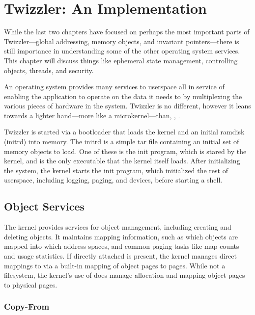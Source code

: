 
\chapter{Twizzler: An Implementation}\label{ch:twizzler}

\begin{chabstract}
    While the last two chapters have focused on perhaps the most important parts of Twizzler---global addressing, memory
    objects, and invariant pointers---there is still importance in understanding some of the other operating system
    services. This chapter will discuss things like ephemeral state management, controlling objects, threads, and security.
\end{chabstract}

An operating system provides many services to userspace all in service of enabling the application to operate on the
data it needs to by multiplexing the various pieces of hardware in the system. Twizzler is no different, however it
leans towards a lighter hand---more like a microkernel---than, \eg, \unix.

Twizzler is started via a bootloader that loads the kernel and an initial ramdisk (initrd) into memory. The initrd is a
simple tar file containing an initial set of memory objects to load. One of these is the init program, which is stared
by the kernel, and is the only executable that the kernel itself loads. After initializing the system, the kernel starts
the init program, which initialized the rest of userspace, including logging, paging, and devices, before starting a shell.

\section{Object Services}

The kernel provides services for object management, including creating and deleting objects. It maintains mapping
information, such as which objects are mapped into which address spaces, and common paging tasks like map counts and
usage statistics. If directly attached \NVM is present, the kernel manages direct mappings to \NVM via a built-in
mapping of object pages to \NVM pages. While not a filesystem, the kernel's use of \NVM does manage allocation and
mapping object pages to physical pages.

\subsection{Copy-From}

